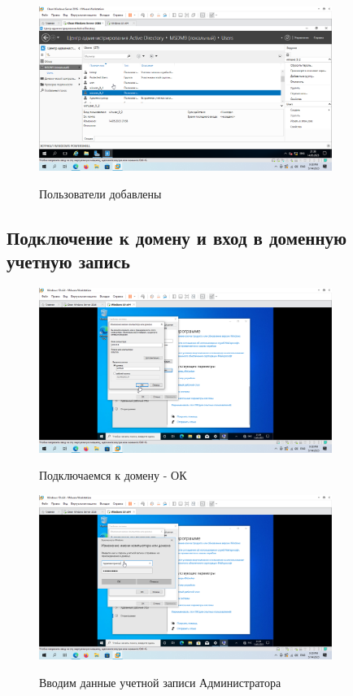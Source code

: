 \documentclass[a4paper]{article}
\begin{document}
  \begin{figure}[H]
    \centering
    \includegraphics[width=0.85\textwidth]{5_0086}
    \label{img:86}
    \caption{Пользователи добавлены}
  \end{figure}

  \subsection{Подключение к домену и вход в доменную учетную запись}

  \begin{figure}[H]
    \centering
    \includegraphics[width=0.85\textwidth]{5_0087}
    \label{img:87}
    \caption{Подключаемся к домену - ОК}
  \end{figure}

  \begin{figure}[H]
    \centering
    \includegraphics[width=0.85\textwidth]{5_0088}
    \label{img:88}
    \caption{Вводим данные учетной записи Администратора}
  \end{figure}
\end{document}
